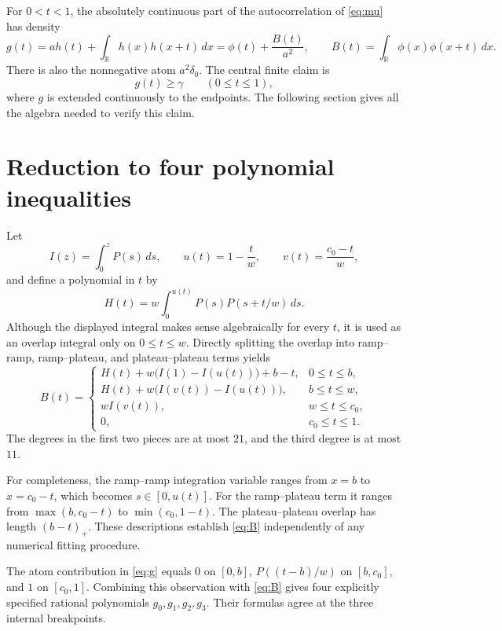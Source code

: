 \documentclass[11pt,a4paper]{article}
\theoremstyle{remark}\newtheorem{remark}[theorem]{Remark}
\newcommand{\R}{\mathbb R}
\begin{document}
For $0<t<1$, the absolutely continuous part of the autocorrelation of \eqref{eq:mu} has density
\begin{equation}\label{eq:g}
 g(t)=a h(t)+\int_\R h(x)h(x+t)\,dx
     =\phi(t)+\frac{B(t)}{a^2},
 \qquad B(t)=\int_\R\phi(x)\phi(x+t)\,dx.
\end{equation}
There is also the nonnegative atom $a^2\delta_0$. The central finite claim is
\begin{equation}\label{eq:core}
 g(t)\ge\gamma\qquad(0\le t\le1),
\end{equation}
where $g$ is extended continuously to the endpoints. The following section gives all the algebra needed to verify this claim.

\section{Reduction to four polynomial inequalities}
Let
\[
 I(z)=\int_0^zP(s)\,ds,\qquad
 u(t)=1-\frac t w,\qquad v(t)=\frac{c_0-t}{w},
\]
and define a polynomial in $t$ by
\[
 H(t)=w\int_0^{u(t)}P(s)P(s+t/w)\,ds.
\]
Although the displayed integral makes sense algebraically for every $t$, it is used as an overlap integral only on $0\le t\le w$. Directly splitting the overlap into ramp--ramp, ramp--plateau, and plateau--plateau terms yields
\begin{equation}\label{eq:B}
 B(t)=\begin{cases}
 H(t)+w\bigl(I(1)-I(u(t))\bigr)+b-t,&0\le t\le b,\\
 H(t)+w\bigl(I(v(t))-I(u(t))\bigr),&b\le t\le w,\\
 w I(v(t)),&w\le t\le c_0,\\
 0,&c_0\le t\le1.
 \end{cases}
\end{equation}
The degrees in the first two pieces are at most $21$, and the third degree is at most $11$.

For completeness, the ramp--ramp integration variable ranges from $x=b$ to $x=c_0-t$, which becomes $s\in[0,u(t)]$. For the ramp--plateau term it ranges from $\max(b,c_0-t)$ to $\min(c_0,1-t)$. The plateau--plateau overlap has length $(b-t)_+$. These descriptions establish \eqref{eq:B} independently of any numerical fitting procedure.

The atom contribution in \eqref{eq:g} equals $0$ on $[0,b]$, $P((t-b)/w)$ on $[b,c_0]$, and $1$ on $[c_0,1]$. Combining this observation with \eqref{eq:B} gives four explicitly specified rational polynomials $g_0,g_1,g_2,g_3$. Their formulas agree at the three internal breakpoints.
\end{document}
